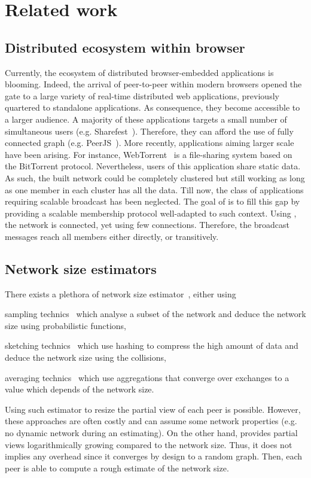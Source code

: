 
\section{Related work}
\label{sec:relatedwork}

\subsection{Distributed ecosystem within browser}
Currently, the ecosystem of distributed browser-embedded applications is
blooming. Indeed, the arrival of peer-to-peer within modern browsers opened the
gate to a large variety of real-time distributed web applications, previously
quartered to standalone applications. As consequence, they become accessible to
a larger audience. A majority of these applications targets a small number of
simultaneous users (e.g. Sharefest~\cite{sharefest}). Therefore, they can
afford the use of fully connected graph (e.g. PeerJS~\cite{peerjs}). More
recently, applications aiming larger scale have been arising. For instance,
WebTorrent~\cite{webtorrent} is a file-sharing system based on the BitTorrent
protocol. Nevertheless, users of this application share static data. As such,
the built network could be completely clustered but still working as long as
one member in each cluster has all the data.  Till now, the class of
applications requiring scalable broadcast has been neglected. The goal of
\SCAMPLON{} is to fill this gap by providing a scalable membership protocol
well-adapted to such context. Using \SCAMPLON{}, the network is connected, yet
using few connections. Therefore, the broadcast messages reach all members
either directly, or transitively.


\subsection{Network size estimators}
There exists a plethora of network size
estimator~\cite{kostoulas2007active,baquero2012extrema}, either using
\begin{inparaenum}[(i)]
\item sampling technics~\cite{ganesh2007peer,kostoulas2007active} which analyse
  a subset of the network and deduce the network size using probabilistic
  functions,
\item sketching technics~\cite{baquero2012extrema} which use hashing to
  compress the high amount of data and deduce the network size using the
  collisions,
\item averaging technics~\cite{jelasity2004epidemic} which use aggregations
  that converge over exchanges to a value which depends of the network size.
\end{inparaenum}
Using such estimator to resize the partial view of each peer is
possible. However, these approaches are often costly and can assume some
network properties (e.g. no dynamic network during an estimating). On the other
hand, \SCAMPLON{} provides partial views logarithmically growing compared to
the network size. Thus, it does not implies any overhead since it converges by
design to a random graph. Then, each peer is able to compute a rough estimate
of the network size.

